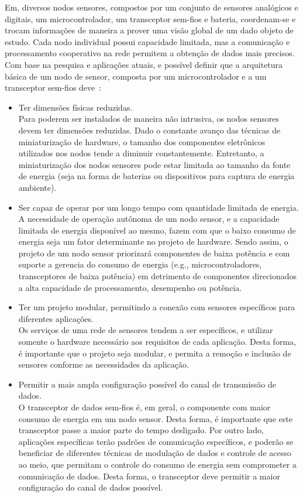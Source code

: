 Em\rssf, diversos nodos sensores, compostos por um conjunto de sensores
analógicos e digitais, um microcontrolador, um transceptor sem-fios e bateria,
coordenam-se e trocam informações de maneira a prover uma visão global de um
dado objeto de estudo. Cada nodo individual possui capacidade limitada, mas a
comunicação e processamento cooperativo na rede permitem a obtenção de dados
mais precisos. Com base na pesquisa e aplicações atuais, e possível definir que
a arquitetura básica de um nodo de sensor, composta por um microcontrolador e a
um transceptor sem-fios deve~\cite{Wanner:MSC:2006}:
\begin{itemize}
    \item Ter dimensões físicas reduzidas.\\
    Para poderem ser instalados de maneira não intrusiva, os nodos sensores
    devem ter dimensões reduzidas. Dado o constante avanço das técnicas de
    miniaturização de hardware, o tamanho dos componentes eletrônicos utilizados
    nos nodos tende a diminuir constantemente. Entretanto, a miniaturização dos
    nodos sensores pode estar limitada ao tamanho da fonte de energia (seja na
    forma de baterias ou dispositivos para captura de energia ambiente).

    \item Ser capaz de operar por um longo tempo com quantidade limitada de
    energia.\\
    A necessidade de operação autônoma de um nodo sensor, e a capacidade
    limitada de energia disponível ao mesmo, fazem com que o baixo consumo de
    energia seja um fator determinante no projeto de hardware. Sendo assim, o
    projeto de um nodo sensor priorizará componentes de baixa potência e com
    suporte a gerencia do consumo de energia (e.g., microcontroladores,
    transceptores de baixa potência) em detrimento de componentes direcionados a
    alta capacidade de processamento, desempenho ou potência.

    \item Ter um projeto modular, permitindo a conexão com sensores específicos
    para diferentes aplicações.\\
    Os serviços de uma rede de sensores tendem a ser específicos, e utilizar
    somente o hardware necessário aos requisitos de cada aplicação. Desta forma,
    é importante que o projeto seja modular, e permita a remoção e inclusão de
    sensores conforme as necessidades da aplicação.

    \item Permitir a mais ampla configuração possível do canal de transmissão de
    dados.\\
    O transceptor de dados sem-fios é, em geral, o componente com maior consumo
    de energia em um nodo sensor. Desta forma, é importante que este transceptor
    passe a maior parte do tempo desligado. Por outro lado, aplicações
    específicas terão padrões de comunicação específicos, e poderão se beneficiar
    de diferentes técnicas de modulação de dados e controle de acesso ao meio,
    que permitam o controle do consumo de energia sem comprometer a comunicação
    de dados. Desta forma, o transceptor deve permitir a maior configuração do
    canal de dados possível.


\end{itemize}

